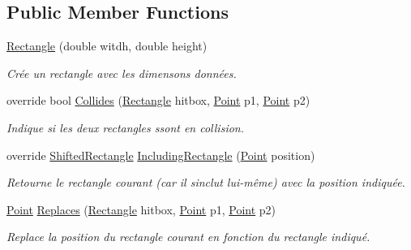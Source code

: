 \subsection*{Public Member Functions}
\begin{DoxyCompactItemize}
\item 
\hyperlink{class_tentacle_slicers_1_1collisions_1_1_rectangle_acfb56947ab8ea94dcba7fb6ce2956b9f}{Rectangle} (double witdh, double height)
\begin{DoxyCompactList}\small\item\em Crée un rectangle avec les dimensons données. \end{DoxyCompactList}\item 
override bool \hyperlink{class_tentacle_slicers_1_1collisions_1_1_rectangle_a8d770e1cd3fc4b6315f791f918fa4eaa}{Collides} (\hyperlink{class_tentacle_slicers_1_1collisions_1_1_rectangle}{Rectangle} hitbox, \hyperlink{class_tentacle_slicers_1_1general_1_1_point}{Point} p1, \hyperlink{class_tentacle_slicers_1_1general_1_1_point}{Point} p2)
\begin{DoxyCompactList}\small\item\em Indique si les deux rectangles ssont en collision. \end{DoxyCompactList}\item 
override \hyperlink{struct_tentacle_slicers_1_1collisions_1_1_shifted_rectangle}{Shifted\+Rectangle} \hyperlink{class_tentacle_slicers_1_1collisions_1_1_rectangle_a89ed2b7c68bab5fa949388dc7d16cb0d}{Including\+Rectangle} (\hyperlink{class_tentacle_slicers_1_1general_1_1_point}{Point} position)
\begin{DoxyCompactList}\small\item\em Retourne le rectangle courant (car il s\textquotesingle{}inclut lui-\/même) avec la position indiquée. \end{DoxyCompactList}\item 
\hyperlink{class_tentacle_slicers_1_1general_1_1_point}{Point} \hyperlink{class_tentacle_slicers_1_1collisions_1_1_rectangle_af1479110f926f911173795bf9c7a5a4c}{Replaces} (\hyperlink{class_tentacle_slicers_1_1collisions_1_1_rectangle}{Rectangle} hitbox, \hyperlink{class_tentacle_slicers_1_1general_1_1_point}{Point} p1, \hyperlink{class_tentacle_slicers_1_1general_1_1_point}{Point} p2)
\begin{DoxyCompactList}\small\item\em Replace la position du rectangle courant en fonction du rectangle indiqué. \end{DoxyCompactList}\end{DoxyCompactItemize}
